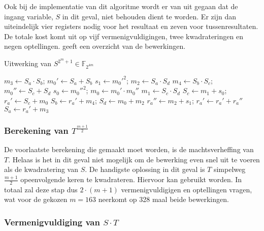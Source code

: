 Ook bij de implementatie van dit algoritme wordt er van uit gegaan dat de ingang variable, $S$ in dit geval, niet behouden dient te worden. Er zijn dan uiteindelijk vier registers nodig voor het resultaat en zeven voor tussenresultaten. De totale kost komt uit op vijf vermenigvuldigingen, twee kwadrateringen en negen optellingen.  geeft een overzicht van de bewerkingen.


\begin{algorithm}[h]
	\caption{Uitwerking van $S^{2^m + 1} \in \mathbb{F}_{2^{4m}}$}
	\label{algoritme-implementatie-miller-v-power}
	$m_3 \leftarrow S_a \cdot S_b$; $m_0' \leftarrow S_a + S_b$\;
	$s_1 \leftarrow m_0'^2$; $m_2 \leftarrow S_a \cdot S_d$\;
	$m_4 \leftarrow S_b \cdot S_c$; $m_0'' \leftarrow S_c + S_d$\;
	$s_0 \leftarrow m_0''^2$; $m_0 \leftarrow m_0' \cdot m_0''$\;
	$m_1 \leftarrow S_c \cdot S_d$\;
	$S_c \leftarrow m_1 + s_0$; $r_a' \leftarrow S_c + m_0$\;
	$S_b \leftarrow r_a' + m_4$; $S_d \leftarrow m_0 + m_2$\;
	$r_a'' \leftarrow m_2 + s_1$; $r_a' \leftarrow r_a' + r_a''$\;
	$S_a \leftarrow r_a' + m_3$\;
\end{algorithm}

\subsubsection{Berekening van $T^{\frac{m + 1}{2}}$}

De voorlaatste berekening die gemaakt moet worden, is de machtsverheffing van $T$. Helaas is het in dit geval niet mogelijk om de bewerking even snel uit te voeren als de kwadratering van $S$. De handigste oplossing in dit geval is $T$ simpelweg $\frac{m + 1}{2}$ opeenvolgende keren te kwadrateren. Hiervoor kan  gebruikt worden. In totaal zal deze stap dus $2 \cdot (m + 1)$ vermenigvuldigigen en optellingen vragen, wat voor de gekozen $m = 163$ neerkomt op 328 maal beide bewerkingen.

\subsubsection{Vermenigvuldiging van $S \cdot T$}

